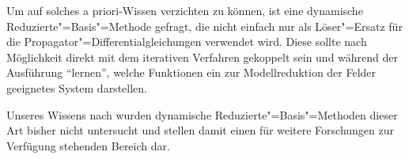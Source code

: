\documentclass[../main.tex]{subfiles}
\begin{document}
Um auf solches a priori-Wissen verzichten zu können, ist eine dynamische Reduzierte"=Basis"=Methode gefragt, die nicht einfach nur als Löser"=Ersatz für die Propagator"=Differentialgleichungen verwendet wird.
Diese sollte nach Möglichkeit direkt mit dem iterativen Verfahren gekoppelt sein und während der Ausführung \enquote{lernen}, welche Funktionen ein zur Modellreduktion der Felder geeignetes System darstellen.

Unseres Wissens nach wurden dynamische Reduzierte"=Basis"=Methoden dieser Art bisher nicht untersucht und stellen damit einen für weitere Forschungen zur Verfügung stehenden Bereich dar.
\end{document}
